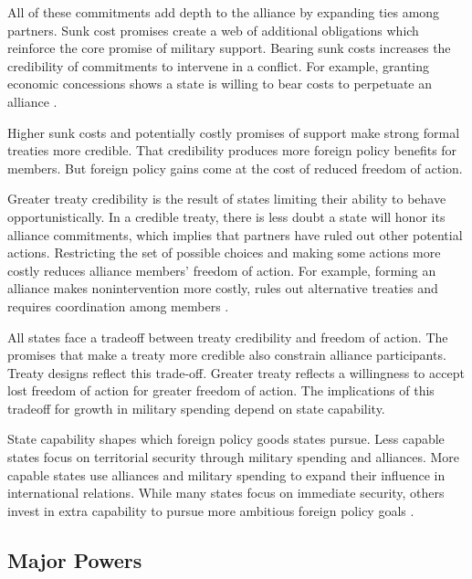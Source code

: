 \documentclass[12pt]{article}
\begin{document}
All of these commitments add depth to the alliance by expanding ties among partners. 
Sunk cost promises create a web of additional obligations which reinforce the core promise of military support.  
Bearing sunk costs increases the credibility of commitments to intervene in a conflict. 
For example, granting economic concessions shows a state is willing to bear costs to perpetuate an alliance \citep{WolfordKim2017}. 


Higher sunk costs and potentially costly promises of support make strong formal treaties more credible.
That credibility produces more foreign policy benefits for members. 
But foreign policy gains come at the cost of reduced freedom of action. 


Greater treaty credibility is the result of states limiting their ability to behave opportunistically. 
In a credible treaty, there is less doubt a state will honor its alliance commitments, which implies that partners have ruled out other potential actions. 
Restricting the set of possible choices and making some actions more costly reduces alliance members' freedom of action. 
For example, forming an alliance makes nonintervention more costly, rules out alternative treaties and requires coordination among members \citep{Snyder1997}. 


All states face a tradeoff between treaty credibility and freedom of action. 
The promises that make a treaty more credible also constrain alliance participants. 
Treaty designs reflect this trade-off. 
Greater treaty reflects a willingness to accept lost freedom of action for greater freedom of action. 
The implications of this tradeoff for growth in military spending depend on state capability. 


State capability shapes which foreign policy goods states pursue. 
Less capable states focus on territorial security through military spending and alliances. 
More capable states use alliances and military spending to expand their influence in international relations. 
While many states focus on immediate security, others invest in extra capability to pursue more ambitious foreign policy goals \citep{Fordham2011, MarkowitzFariss2017}. 


\subsection{Major Powers} 
\end{document}
